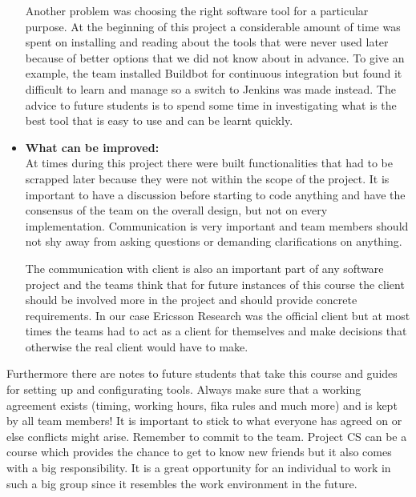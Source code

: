 \begin{itemize}
Another problem was choosing the right software tool for a particular purpose. At the 
beginning of this project a considerable amount of time was spent on installing and reading about the tools that were never 
used later because of better options that we did not know about in advance. To give an example, the team installed Buildbot for continuous integration but found 
it difficult to learn and manage so a switch to Jenkins was made instead. The advice to future students is to 
spend some time in investigating what is the best tool that is easy to use and can be learnt quickly.

\item{\textbf{What can be improved:}}\\
 At times during this project there were built functionalities that had to be scrapped later because they were not 
 within the scope of the project. It is important to have a discussion before starting to code anything 
 and have the consensus of the team on the overall design, but not on every implementation. Communication is very important and team members should not shy away from asking 
 questions or demanding clarifications on anything.  
 
The communication with client is also an important part of any software project and the teams think that 
for future instances of this course the client should be involved more in the project and should 
provide concrete requirements. In our case Ericsson Research was the official client 
but at most times the teams had to act as a client for themselves and make decisions that otherwise the real 
client would have to make. 
\end{itemize}

Furthermore there are notes to future students that take this course and guides for setting up and configurating tools.
Always make sure that a working agreement exists (timing, working hours, fika rules and much more) and
is kept by all team members! It is important to stick to what everyone has agreed on or else
conflicts might arise. 
Remember to commit to the team. Project CS can be a course which provides the chance to get to know new friends but it also comes with a big responsibility.
It is a great opportunity for an individual to work in such a big group since
it resembles the work environment in the future.
